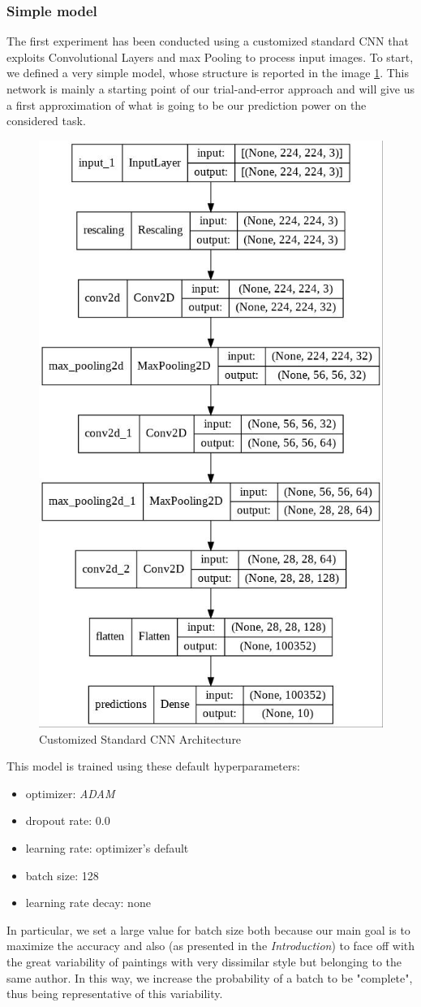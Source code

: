 \subsubsection{Simple model}
The first experiment has been conducted using a customized standard CNN that exploits Convolutional Layers and max Pooling to process input images. To start, we defined a very simple model, whose structure is reported in the image \ref{fig:standardCNN}. This network is mainly a starting point of our trial-and-error approach and will give us a first approximation of what is going to be our prediction power on the considered task.
\begin{figure}[H]
	\centering
	\includegraphics[height=0.6\textwidth]{img/scratch/standardCNN.jpg}
	\caption{Customized Standard CNN Architecture}
	\label{fig:standardCNN}
\end{figure}

\noindent This model is trained using these default hyperparameters:
\begin{itemize}
\item optimizer: \textit{ADAM}
\item dropout rate: 0.0
\item learning rate: optimizer's default
\item batch size: 128
\item learning rate decay: none
\end{itemize}

\noindent In particular, we set a large value for batch size both because our main goal is to maximize the accuracy and also (as presented in the \textit{Introduction}) to face off with the great variability of paintings with very dissimilar style but belonging to the same author. In this way, we increase the probability of a batch to be "complete", thus being representative of this variability.

